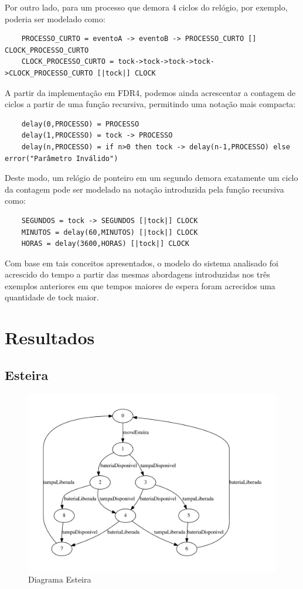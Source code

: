 \documentclass[a4paper,11pt,twocolumns]{article}
\begin{document}
Por outro lado, para um processo que demora 4 ciclos do relógio, por exemplo, poderia ser modelado como:
\begin{verbatim}
    PROCESSO_CURTO = eventoA -> eventoB -> PROCESSO_CURTO [] CLOCK_PROCESSO_CURTO
    CLOCK_PROCESSO_CURTO = tock->tock->tock->tock->CLOCK_PROCESSO_CURTO [|tock|] CLOCK
\end{verbatim}

A partir da implementação em FDR4, podemos ainda acrescentar a contagem de ciclos a partir de uma função recursiva, permitindo uma notação mais compacta:
\begin{verbatim}
    delay(0,PROCESSO) = PROCESSO
    delay(1,PROCESSO) = tock -> PROCESSO
    delay(n,PROCESSO) = if n>0 then tock -> delay(n-1,PROCESSO) else error("Parâmetro Inválido")
\end{verbatim}

Deste modo, um relógio de ponteiro em um segundo demora exatamente um ciclo da contagem pode ser modelado na notação introduzida pela função recursiva como:
\begin{verbatim}
    SEGUNDOS = tock -> SEGUNDOS [|tock|] CLOCK
    MINUTOS = delay(60,MINUTOS) [|tock|] CLOCK
    HORAS = delay(3600,HORAS) [|tock|] CLOCK
\end{verbatim}

Com base em tais conceitos apresentados, o modelo do sistema analisado foi acrescido do tempo a partir das mesmas abordagens introduzidas nos três exemplos anteriores em que tempos maiores de espera foram acrecidos uma quantidade de tock maior.

\section{Resultados}
\subsection{Esteira}
\begin{figure}[H]
    \centering
    \includegraphics[width = 0.6\linewidth]{./img/g_esteira.pdf}
    \caption{Diagrama Esteira}
    \label{fig:g_esteira}
\end{figure}
\end{document}
